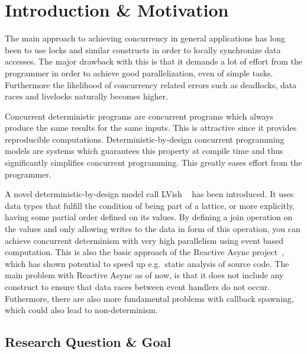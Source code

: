 \chapter{Introduction \& Motivation}
\label{cha:introduction}

The main approach to achieving concurrency in general applications has long been
to use locks and similar constructs in order to locally synchronize data
accesses. The major drawback with this is that it demands a lot of effort from
the programmer in order to achieve good parallelization, even of simple tasks.
Furthermore the likelihood of concurrency related errors such as deadlocks, data
races and livelocks naturally becomes higher. 


Concurrent deterministic programs are concurrent programs which always produce
the same results for the same inputs. This is attractive since it provides
reproducible computations.  Deterministic-by-design concurrent programming
models are systems which guarantees this property at compile time and thus
significantly simplifies concurrent programming. This greatly eases effort
from the programmer. 


A novel deterministic-by-design model call LVish ~\parencite{kuper2013lvars,
kuper2014freeze} has been introduced.  It uses data types that fulfill the
condition of being part of a lattice, or more explicitly, having some partial
order defined on its values. By defining a join operation on the values and only
allowing writes to the data in form of this operation, you can achieve concurrent
determinism with very high parallelism using event based computation.  This is
also the basic approach of the Reactive Async
project~\parencite{conf/scala/HallerGES16}, which has shown potential to speed up
e.g.\ static analysis of source code. The main problem with Reactive Async as
of now, is that it does not include any construct to ensure that data races
between event handlers do not occur. Futhermore, there are also more fundamental
problems with callback spawning, which could also lead to non-determinism.

\section{Research Question \& Goal}%
\label{sec:goal}


